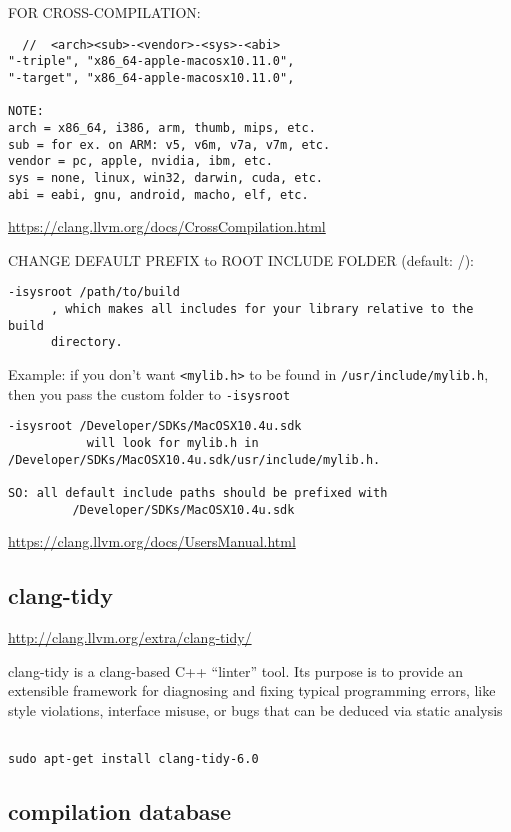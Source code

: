 FOR CROSS-COMPILATION:
\begin{verbatim}
  //  <arch><sub>-<vendor>-<sys>-<abi>
"-triple", "x86_64-apple-macosx10.11.0",
"-target", "x86_64-apple-macosx10.11.0",

NOTE:
arch = x86_64, i386, arm, thumb, mips, etc.
sub = for ex. on ARM: v5, v6m, v7a, v7m, etc.
vendor = pc, apple, nvidia, ibm, etc.
sys = none, linux, win32, darwin, cuda, etc.
abi = eabi, gnu, android, macho, elf, etc.
\end{verbatim}
\url{https://clang.llvm.org/docs/CrossCompilation.html}

CHANGE DEFAULT PREFIX to ROOT INCLUDE FOLDER (default: /):
\begin{verbatim}
-isysroot /path/to/build
      , which makes all includes for your library relative to the build
      directory.
\end{verbatim}

Example: if you don't want \verb!<mylib.h>! to be found in
\verb!/usr/include/mylib.h!, then you pass the custom folder to 
\verb!-isysroot! 
\begin{verbatim}
-isysroot /Developer/SDKs/MacOSX10.4u.sdk 
           will look for mylib.h in
/Developer/SDKs/MacOSX10.4u.sdk/usr/include/mylib.h.

SO: all default include paths should be prefixed with
         /Developer/SDKs/MacOSX10.4u.sdk
\end{verbatim}
\url{https://clang.llvm.org/docs/UsersManual.html}


\subsection{clang-tidy}
\label{sec:clang-tidy}

\url{http://clang.llvm.org/extra/clang-tidy/}


clang-tidy is a clang-based C++ “linter” tool. Its purpose is to provide an
extensible framework for diagnosing and fixing typical programming errors, like
style violations, interface misuse, or bugs that can be deduced via static
analysis
\begin{verbatim}

sudo apt-get install clang-tidy-6.0
\end{verbatim}


\subsection{compilation database}
\label{sec:clang-compilation-database}

